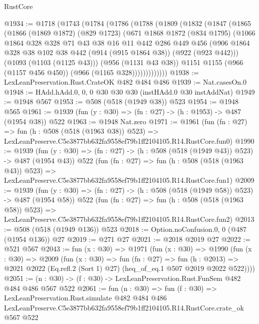 \begin{lexlean}{RustCore}
\begin{coremodule}
@1934 := @1718
    (@1743
      (@1784
        (@1786
          (@1788
            (@1809
              (@1832
                (@1847
                  (@1865
                    (@1866
                      (@1869 @1872)
                      (@829 @1723)
                      (@671
                        @1868
                        @1872
                        (@834 @1795)
                        (@1066
                          @1864
                          @328
                          @328
                          @71
                          @43
                          @38
                          @16
                          @11
                          @442
                          @286
                          @449
                          @456
                          (@906
                            @1864
                            @328
                            @38
                            @102
                            @38
                            @442
                            (@914 (@915 @1864 @38))
                            (@922 (@923 @442)))
                          (@1093 (@1103 (@1125 @43)))
                          (@956 (@1131 @43 @38))
                          @1151
                          @1155
                          (@966 (@1157 @456 @450))
                          (@966 (@1165 @328)))))))))))))
@1938 := LexLeanPreservation.Rust.CrateOK @482 @484 @486
@1939 := Nat.casesOn.{0}
@1948 := HAdd.hAdd.{0, 0, 0} @30 @30 @30 (instHAdd.{0} @30 instAddNat)
@1949 := @1948 @567
@1953 := @508 (@518 (@1949 @38)) @523
@1954 := @1948 @565
@1961 := @1939 (fun (y : @30) => (fn : @27) -> (h : @1953) -> @487 (@1954 @38)) @522
@1963 := @1948 Nat.zero
@1971 := @1961
    (fun (fn : @27) =>
    fun (h : @508 (@518 (@1963 @38)) @523) =>
    LexLeanPreserve.C5e3877bb632fa9558ef79b1ff2104105.R14.RustCore.fun0)
@1990 := @1939
    (fun (y : @30) => (fn : @27) -> (h : @508 (@518 (@1949 @43)) @523) -> @487 (@1954 @43))
    @522
    (fun (fn : @27) =>
    fun (h : @508 (@518 (@1963 @43)) @523) =>
    LexLeanPreserve.C5e3877bb632fa9558ef79b1ff2104105.R14.RustCore.fun1)
@2009 := @1939
    (fun (y : @30) => (fn : @27) -> (h : @508 (@518 (@1949 @58)) @523) -> @487 (@1954 @58))
    @522
    (fun (fn : @27) =>
    fun (h : @508 (@518 (@1963 @58)) @523) =>
    LexLeanPreserve.C5e3877bb632fa9558ef79b1ff2104105.R14.RustCore.fun2)
@2013 := @508 (@518 (@1949 @136)) @523
@2018 := Option.noConfusion.{0, 0} (@487 (@1954 @136)) @27
@2019 := @271 @27
@2021 := @2018 @2019 @27
@2022 := @521 @567
@2043 := fun (x : @30) =>
  @1971
    (fun (x : @30) =>
    @1990
      (fun (x : @30) =>
      @2009
        (fun (x : @30) =>
        fun (fn : @27) =>
        fun (h : @2013) =>
        @2021 @2022 (Eq.refl.{2} (Sort 1) @27) (heq_of_eq.{1} @507 @2019 @2022 @522))))
@2051 := (n : @30) -> (f : @30) -> LexLeanPreservation.Rust.FunSem @482 @484 @486 @567 @522
@2061 := fun (n : @30) =>
  fun (f : @30) =>
  LexLeanPreservation.Rust.simulate
    @482
    @484
    @486
    LexLeanPreserve.C5e3877bb632fa9558ef79b1ff2104105.R14.RustCore.crate_ok
    @567
    @522
\end{coremodule}
\end{lexlean}
